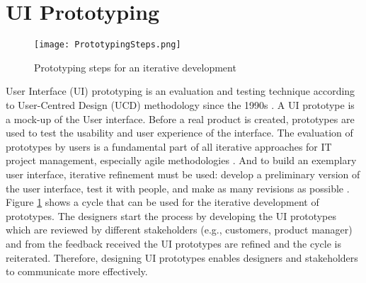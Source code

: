 \section{UI Prototyping}
\label{background:section:uiprototyping}
\begin{figure}[htbp!]
  \centering    
  \texttt{[image: PrototypingSteps.png]}
  \caption[Steps of Prototyping]{Prototyping steps for an iterative development}
  \label{fig:background:stepsPrototyping}
\end{figure}
User Interface (UI) prototyping is an evaluation and testing technique according to User-Centred Design (UCD) methodology since the 1990s \cite{article:prototyping:preece}.
A UI prototype is a mock-up of the User interface.
Before a real product is created, prototypes are used to test the usability and user experience of the interface.
The evaluation of prototypes by users is a fundamental part of all iterative approaches for IT project management, especially agile methodologies \cite{article:prototyping:schwaber}.
And to build an exemplary user interface, iterative refinement must be used: develop a preliminary version of the user interface, test it with people, and make as many revisions as possible \cite{article:prototyping:gould}.
Figure \ref{fig:background:stepsPrototyping} shows a cycle that can be used for the iterative development of prototypes.
The designers start the process by developing the UI prototypes which are reviewed by different stakeholders (e.g., customers, product manager) and from the feedback received the UI prototypes are refined and the cycle is reiterated.
Therefore, designing UI prototypes enables designers and stakeholders to communicate more effectively.

